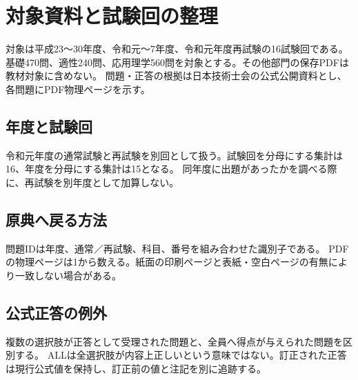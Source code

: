 \chapter{対象資料と試験回の整理}
対象は平成23〜30年度、令和元〜7年度、令和元年度再試験の16試験回である。
基礎470問、適性240問、応用理学560問を対象とする。その他部門の保存PDFは教材対象に含めない。
問題・正答の根拠は日本技術士会の公式公開資料\cite{official_questions,official_answers}とし、各問題にPDF物理ページを示す。
\section{年度と試験回}
令和元年度の通常試験と再試験を別回として扱う。試験回を分母にする集計は16、年度を分母にする集計は15となる。
同年度に出題があったかを調べる際に、再試験を別年度として加算しない。
\section{原典へ戻る方法}
問題IDは年度、通常／再試験、科目、番号を組み合わせた識別子である。
PDFの物理ページは1から数える。紙面の印刷ページと表紙・空白ページの有無により一致しない場合がある。
\section{公式正答の例外}
複数の選択肢が正答として受理された問題と、全員へ得点が与えられた問題を区別する。
ALLは全選択肢が内容上正しいという意味ではない。訂正された正答は現行公式値を保持し、訂正前の値と注記を別に追跡する。
